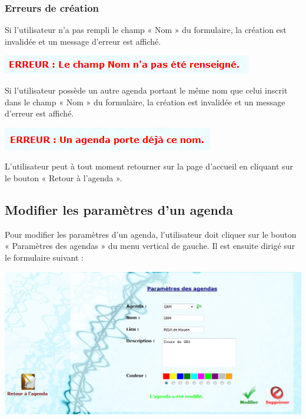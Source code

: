 \documentclass[12pt , a4paper]{article}
\begin{document}
\subsubsection{Erreurs de création}
\noindent Si l’utilisateur n’a pas rempli le champ « Nom » du formulaire, la création est invalidée et un
message d’erreur est affiché.
\begin{center}
  \includegraphics[scale=0.8]{./images/creation_agenda3.png}
\end{center}


\noindent Si l’utilisateur possède un autre agenda portant le même nom que celui inscrit dans le champ
« Nom » du formulaire, la création est invalidée et un message d’erreur est affiché.
\begin{center}
  \includegraphics[scale=0.8]{./images/creation_agenda4.png}
\end{center}




\noindent L’utilisateur peut à tout moment retourner sur la page d’accueil en cliquant sur le bouton
« Retour à l’agenda ».





\subsection{Modifier les paramètres d'un agenda}
\noindent Pour modifier les paramètres d’un agenda, l’utilisateur doit cliquer sur le bouton « Paramètres
des agendas » du menu vertical de gauche. Il est ensuite dirigé sur le formulaire suivant :
\begin{center}
  \includegraphics[scale=0.6]{./images/param_agenda3.png}
\end{center}
\end{document}
